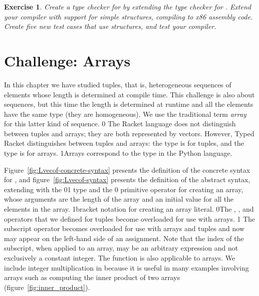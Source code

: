 \documentclass[7x10]{TimesAPriori_MIT}%
\def\racketEd{0}
\def\pythonEd{1}
\def\edition{1}
\newcommand{\racket}[1]{{\if\edition\racketEd{#1}\fi}}
\newcommand{\pythonColor}[0]{}
\newcommand{\python}[1]{{\if\edition\pythonEd\pythonColor #1\fi}}
\newtheorem{exercise}[theorem]{Exercise}
\numberwithin{theorem}{chapter}
\numberwithin{definition}{chapter}
\numberwithin{equation}{chapter}
\begin{document}
{\begin{exercise}\normalfont\normalsize
  Create a type checker for \LangStruct{} by extending the type
  checker for \LangVec{}. Extend your compiler with support for simple
  structures, compiling \LangStruct{} to x86 assembly code. Create
  five new test cases that use structures, and test your compiler.
\end{exercise}


\clearpage
\fi}

\section{Challenge: Arrays}
\label{sec:arrays}


In this chapter we have studied tuples, that is, heterogeneous
sequences of elements whose length is determined at compile time. This
challenge is also about sequences, but this time the length is
determined at runtime and all the elements have the same type (they
are homogeneous). We use the traditional term \emph{array} for this
latter kind of sequence.
%
\racket{
The Racket language does not distinguish between tuples and arrays;
they are both represented by vectors. However, Typed Racket
distinguishes between tuples and arrays: the \code{Vector} type is for
tuples, and the \code{Vectorof} type is for arrays.}%
\python{Arrays correspond to the  type in the Python language.}

Figure~\ref{fig:Lvecof-concrete-syntax} presents the definition of the
concrete syntax for \LangArray{}, and figure~\ref{fig:Lvecof-syntax}
presents the definition of the abstract syntax, extending \LangVec{}
with the \racket{}\python{} type and the
\racket{ primitive operator for creating an array,
whose arguments are the length of the array and an initial value for
all the elements in the array.}%
\python{bracket notation for creating an array literal.}
\racket{The ,
, and \code{vector-ref!} operators that we defined
for tuples become overloaded for use with arrays.}
\python{
The subscript operator becomes overloaded for use with arrays and tuples
and now may appear on the left-hand side of an assignment.
Note that the index of the subscript, when applied to an array, may be an
arbitrary expression and not exclusively a constant integer.
The \code{len} function is also applicable to arrays.
}
%
We include integer multiplication in \LangArray{} because it is
useful in many examples involving arrays such as computing the
inner product of two arrays (figure~\ref{fig:inner_product}).
\end{document}
